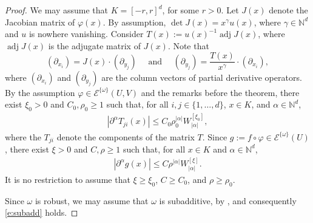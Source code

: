 \documentclass[10pt, reqno]{amsart}
\theoremstyle{plain}
\theoremstyle{definition}
\numberwithin{equation}{section}
\def\al{\alpha}
\def\ga{\gamma}
\def\rh{\rho}
\def\vh{\varphi}
\def\om{\omega}
\def\N{\mathbb{N}}
\def\cE{\mathcal{E}}
\def\p{\partial}
\renewcommand{\o}{\circ}
\let\on=\operatorname
\begin{document}
\begin{proof}
    We may assume that $K = [-r,r]^d$, for some $r>0$.
    Let $J(x)$ denote the Jacobian matrix of $\vh(x)$.
    By assumption, $\det J(x) = x^\ga u(x)$, where $\ga \in \N^d$ and $u$ is nowhere vanishing.
    Consider $T(x) := u(x)^{-1} \on{adj} J(x)$, where $\on{adj} J(x)$ is the adjugate matrix of $J(x)$.
    Note that 
    \begin{equation} \label{e:AJ}
        (\p_{x_i}) = J(x) \cdot (\p_{y_j}) \quad \text{ and } \quad (\p_{y_j}) = \frac{T(x)}{x^\ga} \cdot (\p_{x_i}),  
    \end{equation}
    where $(\p_{x_i})$ and $(\p_{y_j})$ are the column vectors of partial derivative operators. 
    By the assumption $\vh \in \cE^{\{\om\}}(U,V)$ and the remarks before the theorem, 
    there exist $\xi_0>0$ and  $C_0,\rh_0 \ge 1$ such that, for all $i,j \in \{1,\ldots,d\}$, $x \in K$, and $\al \in \N^d$,
    \begin{align} \label{e:A0}
        |\p^\al T_{ji}(x)| \le  C_0 \rh_0^{|\al|} W^{[\xi_0]}_{|\al|},
    \end{align}
    where the $T_{ji}$ denote the components of the matrix $T$.
    Since $g := f \o \vh \in \cE^{\{\om\}}(U)$,
    there exist $\xi>0$ and  $C,\rh \ge 1$ such that, for all $x \in K$ and $\al \in \N^d$,
    \begin{align} \label{e:A1}
        |\p^\al g(x)| \le  C \rh^{|\al|} W^{[\xi]}_{|\al|}.
    \end{align}
    It is no restriction to assume that $\xi \ge \xi_0$, $C\ge C_0$, and $\rh \ge \rh_0$. 

    Since $\om$ is robust, we may assume that $\om$ is subadditive, by , 
    and consequently \eqref{e:subadd} holds.


\end{proof}
\end{document}
